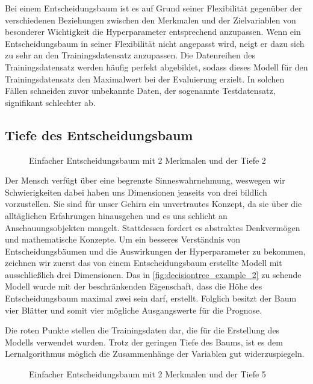 \documentclass[12pt, a4paper]{article}
\begin{document}
Bei einem Entscheidungsbaum ist es auf Grund seiner Flexibilität gegenüber der verschiedenen Beziehungen zwischen den Merkmalen und der Zielvariablen von besonderer Wichtigkeit die Hyperparameter entsprechend anzupassen. Wenn ein Entscheidungsbaum in seiner Flexibilität nicht angepasst wird, neigt er dazu sich zu sehr an den Trainingsdatensatz anzupassen. Die Datenreihen des Trainingsdatensatz werden häufig perfekt abgebildet, sodass dieses Modell für den Trainingsdatensatz den Maximalwert bei der Evaluierung erzielt. In solchen Fällen schneiden zuvor unbekannte Daten, der sogenannte Testdatensatz, signifikant schlechter ab.

\subsection{Tiefe des Entscheidungsbaum}

\begin{figure}[H]
\centering
\def\svgwidth{350pt}

\caption{Einfacher Entscheidungsbaum mit 2 Merkmalen und der Tiefe 2}
\label{fig:decisiontree_example_2}
\end {figure}

Der Mensch verfügt über eine begrenzte Sinneswahrnehmung, weswegen wir Schwierigkeiten dabei haben uns Dimensionen jenseits von drei bildlich vorzustellen. Sie sind für unser Gehirn ein unvertrautes Konzept, da sie über die alltäglichen Erfahrungen hinausgehen und es uns schlicht an Anschauungsobjekten mangelt. Stattdessen fordert es abstraktes Denkvermögen und mathematische Konzepte. Um ein besseres Verständnis von Entscheidungsbäumen und die Auswirkungen der Hyperparameter zu bekommen, zeichnen wir zuerst das von einem Entscheidungsbaum erstellte Modell mit ausschließlich drei Dimensionen. Das in \autoref{fig:decisiontree_example_2} zu sehende Modell wurde mit der beschränkenden Eigenschaft, dass die Höhe des Entscheidungsbaum maximal zwei sein darf, erstellt. Folglich besitzt der Baum vier Blätter und somit vier mögliche Ausgangswerte für die Prognose. 

Die roten Punkte stellen die Trainingsdaten dar, die für die Erstellung des Modells verwendet wurden. Trotz der geringen Tiefe des Baums, ist es dem Lernalgorithmus möglich die Zusammenhänge der Variablen gut widerzuspiegeln.


\begin{figure}[H]
\centering
\def\svgwidth{350pt}

\caption{Einfacher Entscheidungsbaum mit 2 Merkmalen und der Tiefe 5}
\label{fig:decisiontree_example}
\end {figure}
\end{document}

